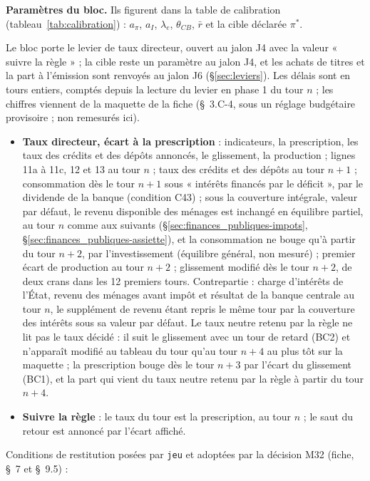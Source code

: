 \documentclass[11pt,a4paper]{article}
\begin{document}
\textbf{Paramètres du bloc.} Ils figurent dans la table de calibration (tableau~\ref{tab:calibration}) : $a_\pi$, $a_I$, $\lambda_e$, $\theta_{\mathit{CB}}$, $\bar r$ et la cible déclarée $\pi^\ast$.

\begin{joueur}
Le bloc porte le levier de taux directeur, ouvert au jalon J4 avec la valeur « suivre la règle » ; la cible reste un paramètre au jalon J4, et les achats de titres et la part à l'émission sont renvoyés au jalon J6 (\S\ref{sec:leviers}). Les délais sont en tours entiers, comptés depuis la lecture du levier en phase 1 du tour $n$ ; les chiffres viennent de la maquette de la fiche (\S~3.C-4, sous un réglage budgétaire provisoire ; non remesurés ici).
\begin{itemize}
\item \textbf{Taux directeur, écart à la prescription} : indicateurs, la prescription, les taux des crédits et des dépôts annoncés, le glissement, la production ; lignes 11a à 11c, 12 et 13 au tour $n$ ; taux des crédits et des dépôts au tour $n + 1$ ; consommation dès le tour $n + 1$ sous « intérêts financés par le déficit », par le dividende de la banque (condition C43) ; sous la couverture intégrale, valeur par défaut, le revenu disponible des ménages est inchangé en équilibre partiel, au tour $n$ comme aux suivants (\S\ref{sec:finances_publiques-impots}, \S\ref{sec:finances_publiques-assiette}), et la consommation ne bouge qu'à partir du tour $n + 2$, par l'investissement (équilibre général, non mesuré) ; premier écart de production au tour $n + 2$ ; glissement modifié dès le tour $n + 2$, de deux crans dans les 12 premiers tours. Contrepartie : charge d'intérêts de l'État, revenu des ménages avant impôt et résultat de la banque centrale au tour $n$, le supplément de revenu étant repris le même tour par la couverture des intérêts sous sa valeur par défaut. Le taux neutre retenu par la règle ne lit pas le taux décidé : il suit le glissement avec un tour de retard (BC2) et n'apparaît modifié au tableau du tour qu'au tour $n + 4$ au plus tôt sur la maquette ; la prescription bouge dès le tour $n + 3$ par l'écart du glissement (BC1), et la part qui vient du taux neutre retenu par la règle à partir du tour $n + 4$.
\item \textbf{Suivre la règle} : le taux du tour est la prescription, au tour $n$ ; le saut du retour est annoncé par l'écart affiché.
\end{itemize}
Conditions de restitution posées par \texttt{jeu} et adoptées par la décision M32 (fiche, \S~7 et \S~9.5) :

\end{joueur}
\end{document}
